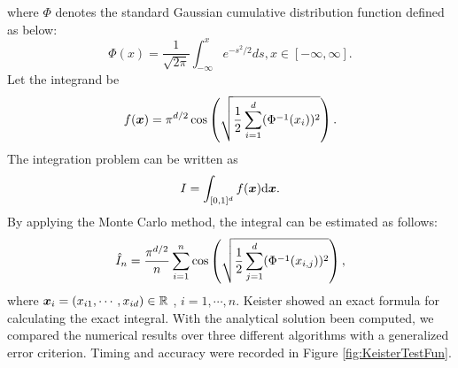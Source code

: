 \documentclass{iitthesis}
\theoremstyle{definition}
\begin{document}
where $\Phi$ denotes the standard Gaussian cumulative distribution function defined as below:
$$\Phi(x) = \frac{1}{\sqrt{2\pi}} \int_{-\infty}^x e^{-s^2/2}ds, x \in [-\infty, \infty].$$
Let the integrand be 
\begin{equation*}
f(\boldsymbol{x}) = \pi^{d/2} \cos \left( \sqrt{\frac{1}{2} \sum_{i=1}^d (\Phi^{-1} (x_i))^2}\right).
\end{equation*}
The integration problem can be written as
\begin{equation*}
I = \int_{[0,1]^d} f(\boldsymbol{x}){\rm d}\boldsymbol{x}.
\end{equation*}
By applying the Monte Carlo method, the integral can be estimated as follows:
\begin{align}
\hat{I}_n = \frac{\pi^{d/2}}{n}\sum_{i=1}^n \cos \left (\sqrt{\frac12 \sum_{j=1}^d (\Phi^{-1}(x_{i,j}))^2}\right),
\end{align}
where $\boldsymbol{x}_i = (x_{i1},\cdots,x_{id}) \in \mathbb{R}$ , $i=1,\cdots, n.$
Keister \cite{Keister96} showed an exact formula for calculating the exact integral. With the analytical solution been computed, we compared the numerical results over three different algorithms with a generalized error criterion. Timing and accuracy were recorded in Figure \ref{fig:KeisterTestFun}.
\end{document}
